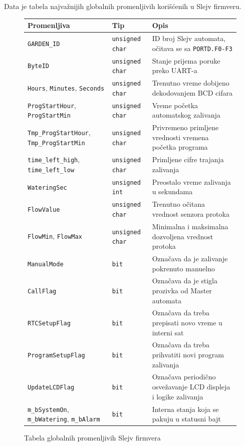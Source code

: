 \documentclass[12pt]{article}
\numberwithin{figure}{section}
\begin{document}
  Data je tabela najvažnijih globalnih promenljivih korišćenih u Slejv firmveru.

  \begin{figure}[ht]
  \centering
  \small
  \begin{tabular}{|m{3.6cm}|m{3cm}|m{6.8cm}|}
    \hline
    Promenljiva & Tip & Opis \\ \hline
    \texttt{GARDEN\_ID} & \texttt{unsigned char} & ID broj Slejv automata, očitava se sa \texttt{PORTD.F0-F3} \\ \hline
    \texttt{ByteID} & \texttt{unsigned char} & Stanje prijema poruke preko UART-a \\ \hline
    \texttt{Hours}, \texttt{Minutes}, \texttt{Seconds} & \texttt{unsigned char} & Trenutno vreme dobijeno dekodovanjem BCD cifara \\ \hline
    \texttt{ProgStartHour}, \texttt{ProgStartMin} & \texttt{unsigned char} & Vreme početka automatskog zalivanja \\ \hline
    \texttt{Tmp\_ProgStartHour}, \texttt{Tmp\_ProgStartMin} & \texttt{unsigned char} & Privremeno primljene vrednosti vremena početka programa \\ \hline
    \texttt{time\_left\_high}, \texttt{time\_left\_low} & \texttt{unsigned char} & Primljene cifre trajanja zalivanja \\ \hline
    \texttt{WateringSec} & \texttt{unsigned int} & Preostalo vreme zalivanja u sekundama \\ \hline
    \texttt{FlowValue} & \texttt{unsigned char} & Trenutno očitana vrednost senzora protoka \\ \hline
    \texttt{FlowMin}, \texttt{FlowMax} & \texttt{unsigned char} & Minimalna i maksimalna dozvoljena vrednost protoka \\ \hline
    \texttt{ManualMode} & \texttt{bit} & Označava da je zalivanje pokrenuto manuelno \\ \hline
    \texttt{CallFlag} & \texttt{bit} & Označava da je stigla prozivka od Master automata \\ \hline
    \texttt{RTCSetupFlag} & \texttt{bit} & Označava da treba prepisati novo vreme u interni sat \\ \hline
    \texttt{ProgramSetupFlag} & \texttt{bit} & Označava da treba prihvatiti novi program zalivanja \\ \hline
    \texttt{UpdateLCDFlag} & \texttt{bit} & Označava periodično osvežavanje LCD displeja i logike zalivanja \\ \hline
    \texttt{m\_bSystemOn}, \texttt{m\_bWatering}, \texttt{m\_bAlarm} & \texttt{bit} & Interna stanja koja se pakuju u statusni bajt \\ \hline
  \end{tabular}
  \caption{Tabela globalnih promenljivih Slejv firmvera}
  \end{figure}
  \normalsize
\end{document}
